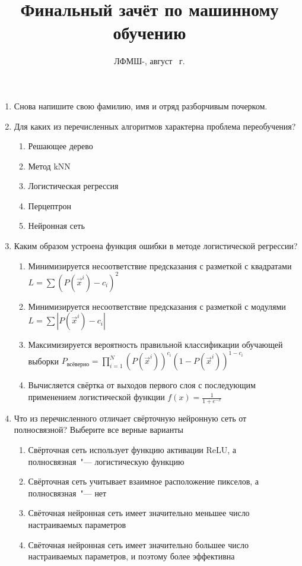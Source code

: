 \documentclass[a4paper,10pt]{article}
\title{Финальный зачёт по машинному обучению}
\date{ЛФМШ-\arabic{LFMSHnumber}, август {\the \year}~г.}
\begin{document}
\maketitle
\begin{enumerate}
	\item Снова напишите свою фамилию, имя и отряд разборчивым почерком.
	\vspace{1cm}
	\item Для каких из перечисленных алгоритмов характерна проблема переобучения?
	\begin{enumerate}
		\item Решающее дерево
		\item Метод kNN
		\item Логистическая регрессия
		\item Перцептрон
		\item Нейронная сеть
	\end{enumerate}
	\item Каким образом устроена функция ошибки в методе логистической регрессии?
	\begin{enumerate}
		\item Минимизируется несоответствие предсказания с разметкой с квадратами $L=\sum (P(\vec x^i) - c_i)^2$
		\item Минимизируется несоответствие предсказания с разметкой с модулями $L=\sum |P(\vec x^i) - c_i|$
		\item 
		\begin{sloppypar}
			Максимизируется вероятность правильной классификации обучающей выборки ${P_{всё верно}=\prod_{i=1}^N (P(\vec x^i))^{c_i} (1 - P(\vec x^i))^{1 - c_i}}$
		\end{sloppypar}
		\item Вычисляется свёртка от выходов первого слоя с последующим применением логистической функции $f(x)=\frac{1}{1+e^{-x}}$
	\end{enumerate}
	
	\item Что из перечисленного отличает свёрточную нейронную сеть от полносвязной? Выберите все верные варианты
	\begin{enumerate}
		\item Свёрточная сеть использует функцию активации ReLU, а полносвязная~"--- логистическую функцию 
		\item Свёрточная сеть учитывает взаимное расположение пикселов, а полносвязная~"--- нет
		\item Свёточная нейронная сеть имеет значительно меньшее число настраиваемых параметров
		\item Свёточная нейронная сеть имеет значительно большее число настраиваемых параметров, и поэтому более эффективна
	\end{enumerate}
	

\end{enumerate}
\end{document}
